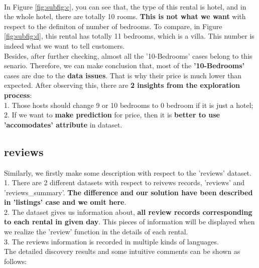 \documentclass{article}
\begin{document}
	\\
	In Figure \ref{fig:subfig:c}, you can see that, the type of this rental is hotel, and in the whole hotel, there are totally 10 rooms. \textbf{This is not what we want} with respect to the definiton of number of bedrooms. To compare, in Figure \ref{fig:subfig:d}, this rental has totally 11 bedrooms, which is a villa. This number is indeed what we want to tell customers.
	\vspace{3pt}
	\\
	Besides, after further checking, almost all the '10-Bedrooms' cases belong to this senario. Therefore, we can make conclusion that, most of the \textbf{'10-Bedrooms'} cases are due to the \textbf{data issues}. That is why their price is much lower than expected. After observing this, there are \textbf{2 insights from the exploration process}:
	\vspace{3pt}
	\\
	1. Those hosts should change 9 or 10 bedrooms to 0 bedroom if it is just a hotel;
	\\
	2. If we want to \textbf{make prediction} for price, then it is \textbf{better to use 'accomodates' attribute} in dataset.
	\subsection{reviews}
	Similarly, we firstly make some description with respect to the 'reviews' dataset.
	\vspace{3pt}
	\\
	1. There are 2 different datasets with respect to reivews records, 'reviews' and 'reviews\_summary'.\textbf{ The difference and our solution have been described in 'listings' case and we omit here}. 
	\\
	2. The dataset gives us information about, \textbf{all review records corresponding to each rental in given day}. This pieces of information will be displayed when we realize the 'review' function in the details of each rental. 
	\\
	3. The reviews information is recorded in multiple kinds of languages.
	\vspace{3pt}
	\\
	The detailed discovery results and some intuitive comments can be shown as follows:
\end{document}
